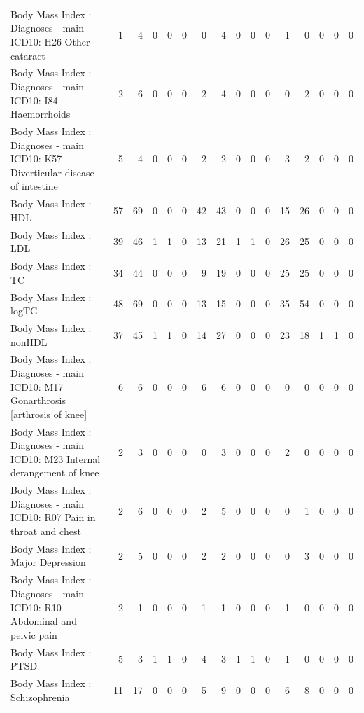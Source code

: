 \begin{table}[ht]
\begin{tabular}{lrrrrrrrrrrrrrrr}
  Body Mass Index  : Diagnoses - main ICD10: H26 Other cataract &   1 &   4 &   0 &   0 &   0 &   0 &   4 &   0 &   0 &   0 &   1 &   0 &   0 &   0 &   0 \\ 
  Body Mass Index  : Diagnoses - main ICD10: I84 Haemorrhoids &   2 &   6 &   0 &   0 &   0 &   2 &   4 &   0 &   0 &   0 &   0 &   2 &   0 &   0 &   0 \\ 
  Body Mass Index  : Diagnoses - main ICD10: K57 Diverticular disease of intestine &   5 &   4 &   0 &   0 &   0 &   2 &   2 &   0 &   0 &   0 &   3 &   2 &   0 &   0 &   0 \\ 
  Body Mass Index  : HDL &  57 &  69 &   0 &   0 &   0 &  42 &  43 &   0 &   0 &   0 &  15 &  26 &   0 &   0 &   0 \\ 
  Body Mass Index  : LDL &  39 &  46 &   1 &   1 &   0 &  13 &  21 &   1 &   1 &   0 &  26 &  25 &   0 &   0 &   0 \\ 
  Body Mass Index  : TC &  34 &  44 &   0 &   0 &   0 &   9 &  19 &   0 &   0 &   0 &  25 &  25 &   0 &   0 &   0 \\ 
  Body Mass Index  : logTG &  48 &  69 &   0 &   0 &   0 &  13 &  15 &   0 &   0 &   0 &  35 &  54 &   0 &   0 &   0 \\ 
  Body Mass Index  : nonHDL &  37 &  45 &   1 &   1 &   0 &  14 &  27 &   0 &   0 &   0 &  23 &  18 &   1 &   1 &   0 \\ 
  Body Mass Index  : Diagnoses - main ICD10: M17 Gonarthrosis [arthrosis of knee] &   6 &   6 &   0 &   0 &   0 &   6 &   6 &   0 &   0 &   0 &   0 &   0 &   0 &   0 &   0 \\ 
  Body Mass Index  : Diagnoses - main ICD10: M23 Internal derangement of knee &   2 &   3 &   0 &   0 &   0 &   0 &   3 &   0 &   0 &   0 &   2 &   0 &   0 &   0 &   0 \\ 
  Body Mass Index  : Diagnoses - main ICD10: R07 Pain in throat and chest &   2 &   6 &   0 &   0 &   0 &   2 &   5 &   0 &   0 &   0 &   0 &   1 &   0 &   0 &   0 \\ 
  Body Mass Index  : Major Depression &   2 &   5 &   0 &   0 &   0 &   2 &   2 &   0 &   0 &   0 &   0 &   3 &   0 &   0 &   0 \\ 
  Body Mass Index  : Diagnoses - main ICD10: R10 Abdominal and pelvic pain &   2 &   1 &   0 &   0 &   0 &   1 &   1 &   0 &   0 &   0 &   1 &   0 &   0 &   0 &   0 \\ 
  Body Mass Index  : PTSD &   5 &   3 &   1 &   1 &   0 &   4 &   3 &   1 &   1 &   0 &   1 &   0 &   0 &   0 &   0 \\ 
  Body Mass Index  : Schizophrenia &  11 &  17 &   0 &   0 &   0 &   5 &   9 &   0 &   0 &   0 &   6 &   8 &   0 &   0 &   0 \\ 

\end{tabular}
\end{table}
